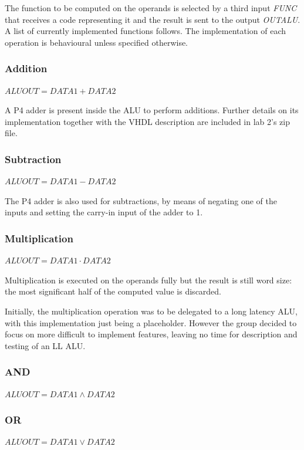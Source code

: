The function to be computed on the operands is selected by a third input \emph{FUNC} that receives a code representing it and the result is sent to the output \emph{OUTALU}. A list of currently implemented functions follows. The implementation of each operation is behavioural unless specified otherwise. 

\subsubsection{Addition}
$ \mathit{ALUOUT} = \mathit{DATA1} + \mathit{DATA2} $

A P4 adder is present inside the ALU to perform additions. Further details on its implementation together with the VHDL description are included in lab 2's zip file.

\subsubsection{Subtraction}
$ \mathit{ALUOUT} = \mathit{DATA1} - \mathit{DATA2} $


The P4 adder is also used for subtractions, by means of negating one of  the inputs and setting the carry-in input of the adder to 1.

\subsubsection{Multiplication}
$ \mathit{ALUOUT} = \mathit{DATA1} \cdot \mathit{DATA2} $


Multiplication is executed on the operands fully but the result is still word size: the most significant half of the computed value is discarded.


Initially, the multiplication operation was to be delegated to a long latency ALU, with this implementation just being a placeholder. However the group decided to focus on more difficult to implement features, leaving no time for description and testing of an LL ALU.

\subsubsection{AND}
$ \mathit{ALUOUT} = \mathit{DATA1} \wedge \mathit{DATA2} $

\subsubsection{OR}
$ \mathit{ALUOUT} = \mathit{DATA1} \lor \mathit{DATA2} $

